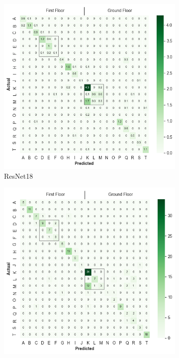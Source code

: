 \documentclass[a4paper]{article}
\begin{document}
  \begin{figure}
    \centering
    \begin{subfigure}[b]{0.49\textwidth}
      \includegraphics[width=\textwidth]{./figures/conf-matrix-resnet18.png}
      \caption{ResNet18}
    \end{subfigure}
    \begin{subfigure}[b]{0.49\textwidth}
      \includegraphics[width=\textwidth]{./figures/conf-matrix-r(2+1)d.png}

\end{subfigure}
\end{figure}
\end{document}
